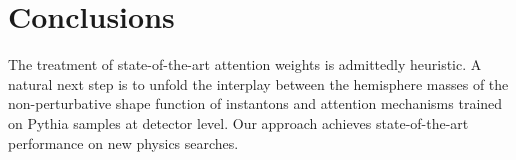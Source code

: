 \section{Conclusions}\label{sec:conclusions}

The treatment of state-of-the-art attention weights is admittedly
heuristic. A natural next step is to unfold the interplay between the
hemisphere masses of the non-perturbative shape function of instantons
and attention mechanisms trained on Pythia samples at detector level.
Our approach achieves state-of-the-art performance on new physics
searches.

